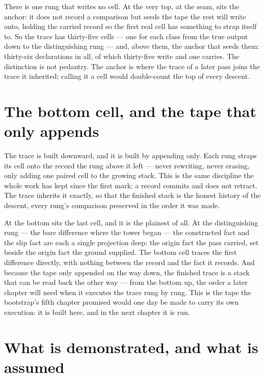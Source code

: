 There is one rung that writes no cell. At the very top, at the seam, sits the anchor: it does not record a
comparison but seeds the tape the rest will write onto, holding the carried record so the first real cell
has something to strap itself to. So the trace has thirty-five cells --- one for each class from the true
output down to the distinguishing rung --- and, above them, the anchor that seeds them: thirty-six
declarations in all, of which thirty-five write and one carries. The distinction is not pedantry. The
anchor is where the trace of a later pass joins the trace it inherited; calling it a cell would double-count
the top of every descent.

\section{The bottom cell, and the tape that only appends}
\label{se:bottom-cell-append-only}

The trace is built downward, and it is built by appending only. Each rung straps its cell onto the record
the rung above it left --- never rewriting, never erasing, only adding one paired cell to the growing
stack. This is the same discipline the whole work has kept since the first mark: a record commits and does
not retract. The trace inherits it exactly, so that the finished stack is the honest history of the
descent, every rung's comparison preserved in the order it was made.

At the bottom sits the last cell, and it is the plainest of all. At the distinguishing rung --- the bare
difference where the tower began --- the constructed fact and the slip fact are each a single projection
deep: the origin fact the pass carried, set beside the origin fact the ground supplied. The bottom cell
traces the first difference directly, with nothing between the record and the fact it records. And because
the tape only appended on the way down, the finished trace is a stack that can be read back the other way
--- from the bottom up, the order a later chapter will need when it executes the trace rung by rung. This
is the tape the bootstrap's fifth chapter promised would one day be made to carry its own execution: it is
built here, and in the next chapter it is run.

\section{What is demonstrated, and what is assumed}
\label{se:demonstrated-assumed-III3}

